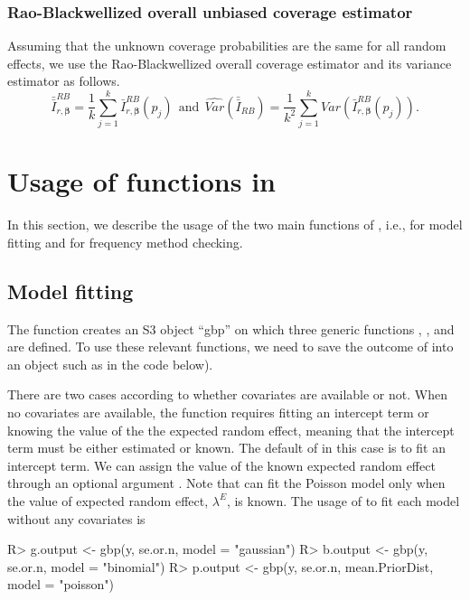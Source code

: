 \documentclass[article]{jss}
\begin{document}
\subsubsection{Rao-Blackwellized overall unbiased coverage estimator}\label{overallRB} Assuming that the unknown  coverage probabilities are the same for all random effects, we use the Rao-Blackwellized overall coverage estimator and its variance estimator as follows.
\begin{equation}\label{RBoverall}
\bar{\bar{I}}^{RB}_{r, \boldsymbol{\beta}} = \frac{1}{k}\sum_{j=1}^k\bar{I}^{RB}_{r, \boldsymbol{\beta}}(p_j)~~\textrm{and}~~ \widehat{Var}(\bar{\bar{I}}_{RB})=\frac{1}{k^2}\sum_{j=1}^k\widehat{Var}(\bar{I}^{RB}_{r, \boldsymbol{\beta}}(p_j)).
\end{equation}


\section[packageoverview]{Usage of functions in }\label{sec5}
In this section, we describe the usage of the two main functions of , i.e.,  for model fitting and  for frequency method checking. 

\subsection{Model fitting}
The function  creates an S3 object ``gbp'' on which  three generic functions , , and  are defined. To use these relevant functions, we need to save the outcome of  into an object such as  in the code below).

There are two cases according to whether covariates are available or not. When no covariates are available, the function  requires fitting an intercept term  or knowing the value of the  the expected random effect, meaning that the intercept term must be either estimated or known. The default of  in this case is to fit an intercept term. We can assign the value of the known expected random effect through an optional argument . Note that  can fit the Poisson model only when the value of expected random effect, $\lambda^E$, is known. The usage of  to  fit each model without any covariates is 
\begin{CodeChunk}
\begin{CodeInput}
R> g.output <- gbp(y, se.or.n, model = "gaussian")
R> b.output <- gbp(y, se.or.n, model = "binomial")
R> p.output <- gbp(y, se.or.n, mean.PriorDist, model = "poisson")
\end{CodeInput}
\end{CodeChunk}
\end{document}
